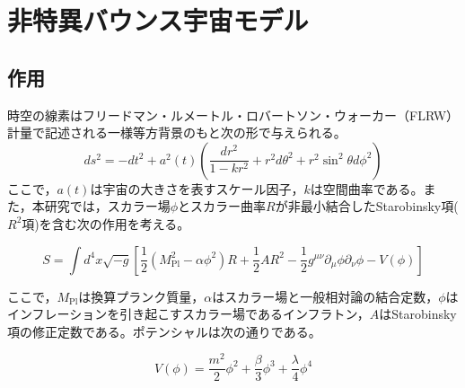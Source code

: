 \section{非特異バウンス宇宙モデル}
    \subsection{作用}

    時空の線素はフリードマン・ルメートル・ロバートソン・ウォーカー（FLRW）計量で記述される一様等方背景のもと次の形で与えられる。
        \begin{dmath}
        ds^2 = -dt^2 + a^2(t) \left( \frac{dr^2}{1 - kr^2} + r^2 d\theta^2 + r^2 \sin^2 \theta d\phi^2 \right)
        \end{dmath}
        ここで，$a(t)$は宇宙の大きさを表すスケール因子，$k$は空間曲率である。また，本研究では，スカラー場$\phi$とスカラー曲率$R$が非最小結合したStarobinsky項($R^2$項)を含む次の作用を考える。

        \begin{dmath}
        S = \int d^4x \sqrt{-g} \left[ \frac{1}{2}(M_{\text{Pl}}^2 - \alpha \phi^2)R + \frac{1}{2}AR^2 - \frac{1}{2}g^{\mu\nu} \partial_\mu \phi \partial_\nu \phi - V(\phi) \right]
        \end{dmath}

        ここで，$M_{\text{Pl}}$は換算プランク質量，$\alpha$はスカラー場と一般相対論の結合定数，$\phi$はインフレーションを引き起こすスカラー場であるインフラトン，$A$はStarobinsky項の修正定数である。ポテンシャルは次の通りである。

        \begin{equation}
        V(\phi) = \frac{m^2}{2}\phi^2 + \frac{\beta}{3}\phi^3 + \frac{\lambda}{4}\phi^4
        \end{equation}